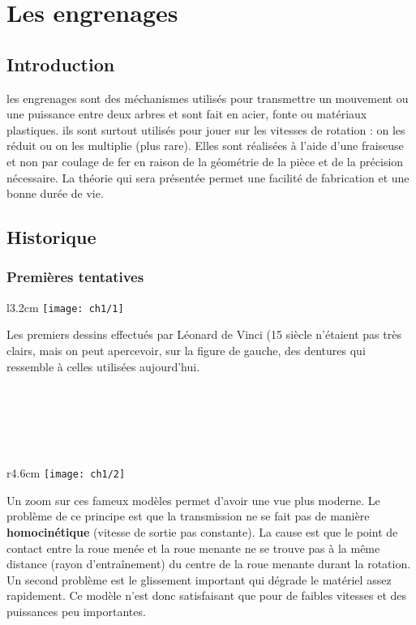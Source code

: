
\chapter{Les engrenages}

\section{Introduction}
	les engrenages sont des méchanismes utilisés pour transmettre un mouvement ou une puissance entre deux arbres et sont fait en acier, fonte ou matériaux plastiques. ils sont surtout utilisés pour jouer sur les vitesses de rotation : on les réduit ou on les multiplie (plus rare). Elles sont réalisées à l'aide d'une fraiseuse et non par coulage de fer en raison de la géométrie de la pièce et de la précision nécessaire. La théorie qui sera présentée permet une facilité de fabrication et une bonne durée de vie.
	
\section{Historique}
\subsection{Premières tentatives}
	\begin{wrapfigure}[4]{l}{3.2cm}
	\vspace{-5mm}
	\texttt{[image: ch1/1]}
	\end{wrapfigure}
	\noindent Les premiers dessins effectués par Léonard de Vinci (15 siècle n'étaient pas très clairs, mais on peut apercevoir, sur la figure de gauche, des dentures qui ressemble à celles utilisées aujourd'hui. \\\\\\\\\\\
	
	\begin{wrapfigure}[10]{r}{4.6cm}
	\vspace{-5mm}
	\texttt{[image: ch1/2]}
	\end{wrapfigure}	
	\noindent Un zoom sur ces fameux modèles permet d'avoir une vue plus moderne. Le problème de ce principe est que la transmission ne se fait pas de manière \textbf{homocinétique} (vitesse de sortie pas constante). La cause est que le point de contact entre la roue menée et la roue menante ne se trouve pas à la même distance (rayon d'entraînement) du centre de la roue menante durant la rotation.  \\
	Un second problème est le glissement important qui dégrade le matériel assez rapidement. Ce modèle n'est donc satisfaisant que pour de faibles vitesses et des puissances peu importantes. \\\\
	
